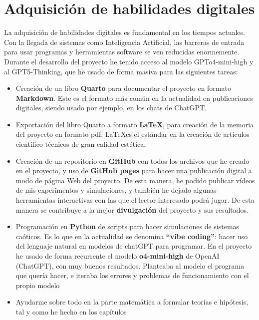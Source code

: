 \documentclass[
  10pt,
  a4paper,
  DIV=11,
  numbers=noendperiod,
  open=any]{scrreprt}
\numberwithin{equation}{chapter}
\numberwithin{equation}{section}
\renewcommand{\[}{\begin{equation}}
\renewcommand{\]}{\end{equation}}
\begin{document}
\section{Adquisición de habilidades
digitales}\label{adquisiciuxf3n-de-habilidades-digitales}

La adquisición de habilidades digitales es fundamental en los tiempos actuales. Con la llegada de sistemas como Inteligencia Artificial, las barreras de entrada para usar programas y herramientas software se ven reducidas enormemente. Durante el desarrollo del proyecto he tenido acceso al modelo GPTo4-mini-high y al GPT5-Thinking, que he usado de forma masiva para las siguientes tareas:

\begin{itemize}
\item
  Creación de un libro \textbf{Quarto} para documentar el proyecto en
  formato \textbf{Markdown}. Este es el formato más común en la
  actualidad en publicaciones digitales, siendo usado por ejemplo, en
  los chats de ChatGPT.
\item
  Exportación del libro Quarto a formato \textbf{\LaTeX}, para creación
  de la memoria del proyecto en formato pdf. \LaTeX es el estándar en la
  creación de artículos científico técnicos de gran calidad estética.
\item
  Creación de un repositorio en \textbf{GitHub} con todos los archivos
  que he creado en el proyecto, y uso de \textbf{GitHub pages} para
  hacer una publicación digital a modo de página Web del proyecto. De
  esta manera, he podido publicar vídeos de mis experimentos y
  simulaciones, y también he dejado algunas herramientas interactivas
  con las que el lector interesado podrá jugar. De esta manera se
  contribuye a la mejor \textbf{divulgación} del proyecto y sus
  resultados.
\item
  Programación en \textbf{Python} de scripts para hacer simulaciones de
  sistemas caóticos. Es lo que en la actualidad se denomina
  \textbf{``vibe coding''}: hacer uso del lenguaje natural en modelos de
  chatGPT para programar. En el proyecto he usado de forma recurrente el
  modelo \textbf{o4-mini-high} de OpenAI (ChatGPT), con muy buenos
  resultados. Planteaba al modelo el programa que quería hacer, e
  iteraba los errores y problemas de funcionamiento con el propio modelo
\item
  Ayudarme sobre todo en la parte matemática a formular teorías e hipótesis, tal y como he hecho en los capítulos  
\end{itemize}
\end{document}
